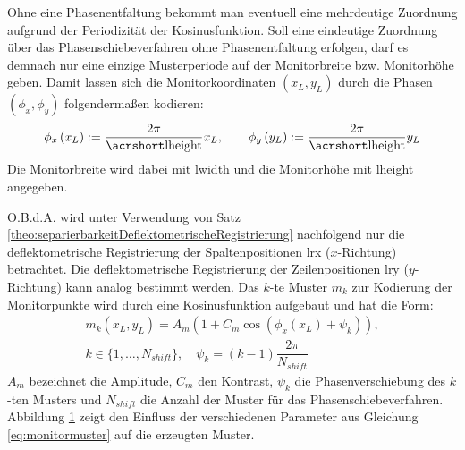 Ohne eine Phasenentfaltung bekommt man eventuell eine mehrdeutige Zuordnung aufgrund der Periodizität der Kosinusfunktion.
Soll eine eindeutige Zuordnung über das Phasenschiebeverfahren ohne Phasenentfaltung erfolgen, darf es demnach nur eine einzige Musterperiode auf der Monitorbreite bzw. Monitorhöhe geben.
Damit lassen sich die Monitorkoordinaten $(x_{L}, y_{L})$ durch die Phasen $(\phi_{x}, \phi_{y})$ folgendermaßen kodieren:
\begin{equation}\label{eq:phasenkodierung}
	\phi_{x}\left(x_L\right) := \dfrac{2\pi}{\acrshortmath{lheight}}x_{L},
	\qquad
	\phi_{y}\left(y_L\right) := \dfrac{2\pi}{\acrshortmath{lheight}}y_{L}
\end{equation}
%
\noindent
Die Monitorbreite wird dabei mit \acrshort{lwidth} und die Monitorhöhe mit \acrshort{lheight} angegeben.

\p
O.B.d.A. wird unter Verwendung von Satz \ref{theo:separierbarkeitDeflektometrischeRegistrierung} nachfolgend nur die deflektometrische Registrierung der Spaltenpositionen \acrshort{lrx} ($x$-Richtung) betrachtet.
Die deflektometrische Registrierung der Zeilenpositionen \acrshort{lry} ($y$-Richtung) kann analog bestimmt werden.
Das $k$-te Muster $m_k$ zur Kodierung der Monitorpunkte wird durch eine Kosinusfunktion aufgebaut und hat die Form:
%
\begin{equation}\label{eq:monitormuster}
	\begin{gathered}	
		m_k(x_L,y_L) = A_m \left(1 + C_m \cos \left(\phi_{x}\left(x_L\right) + \psi_k\right)\right),\\
		k \in \lbrace 1,\ldots,N_{shift}\rbrace,
		\quad
		\psi_k = (k - 1)\dfrac{2\pi}{N_{shift}}
	\end{gathered}
\end{equation}
%
$A_m$ bezeichnet die Amplitude, $C_m$ den Kontrast, $\psi_k$ die Phasenverschiebung des $k$-ten Musters und $N_{shift}$ die Anzahl der Muster für das Phasenschiebeverfahren.
Abbildung \ref{tikz:abbBeispielMusterOhnePhasenentfaltung} zeigt den Einfluss der verschiedenen Parameter aus Gleichung \ref{eq:monitormuster} auf die erzeugten Muster.

{
	\begin{figure}[H]
		\centering
		
		\label{tikz:abbBeispielMusterOhnePhasenentfaltung}
	\end{figure}
}

